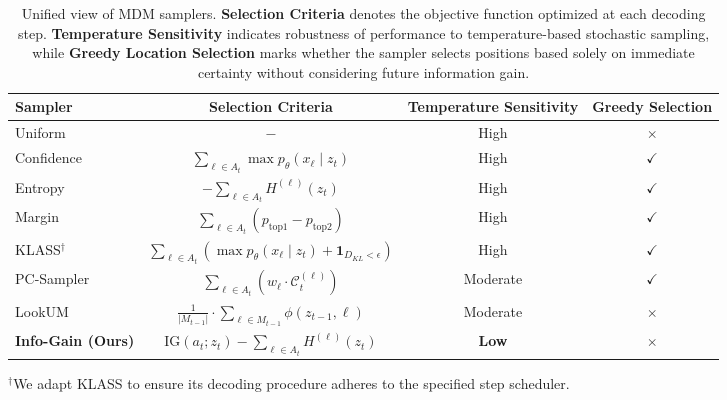 \begin{table}[t]
\centering
\caption{Unified view of MDM samplers. \textbf{Selection Criteria} denotes the objective function optimized at each decoding step. \textbf{Temperature Sensitivity} indicates robustness of performance to temperature-based stochastic sampling, while \textbf{Greedy Location Selection} marks whether the sampler selects positions based solely on immediate certainty without considering future information gain.}
\label{tab:comparison}
\begin{tabular}{@{}lccc@{}}
\toprule
\textbf{Sampler} & \textbf{Selection Criteria} & \textbf{Temperature Sensitivity} & \textbf{Greedy Selection} \\ 
\midrule
Uniform~\cite{austin2021structured}  & $-$ & High & {\color{green!60!black}$\times$} \\
Confidence~\cite{chang2022maskgit}  & $\sum_{\ell \in A_t}\max p_\theta(x_\ell\mid z_t)$ & High & {\color{red}$\checkmark$} \\
Entropy~\cite{benhamu2025entropy}  & $-\sum_{\ell \in A_t} H^{(\ell)}(z_t)$ & High & {\color{red}$\checkmark$} \\
Margin~\cite{kim2025train}  & $\sum_{\ell \in A_t}(p_{\text{top1}} - p_{\text{top2}})$ & High & {\color{red}$\checkmark$} \\
KLASS$^\dagger$~\cite{kim2025klass}  & $\sum_{\ell \in A_t}(\max p_\theta(x_\ell\mid z_t)+\mathbf{1}_{D_{KL}<\epsilon})$ & High & {\color{red}$\checkmark$} \\
PC-Sampler~\cite{huang2025pc}  & $\sum_{\ell \in A_t}(w_\ell \cdot \mathcal{C}_t^{(\ell)})$ & Moderate & {\color{red}$\checkmark$} \\
LookUM~\cite{lee2025lookahead}  & $\frac{1}{|M_{t-1}|} \cdot\sum_{\ell \in M_{t-1}}\phi(z_{t-1}, \ell)$ & Moderate & {\color{green!60!black}$\times$} \\

\midrule
\textbf{Info-Gain (Ours)} & $\text{IG}(a_t; z_t)-\sum_{\ell \in A_t} H^{(\ell)}(z_t)$ & \textbf{Low} & {\color{green!60!black}$\times$} \\ 
\bottomrule
\end{tabular}
$^\dagger$We adapt KLASS to ensure its decoding procedure adheres to the specified step scheduler.
\end{table}
